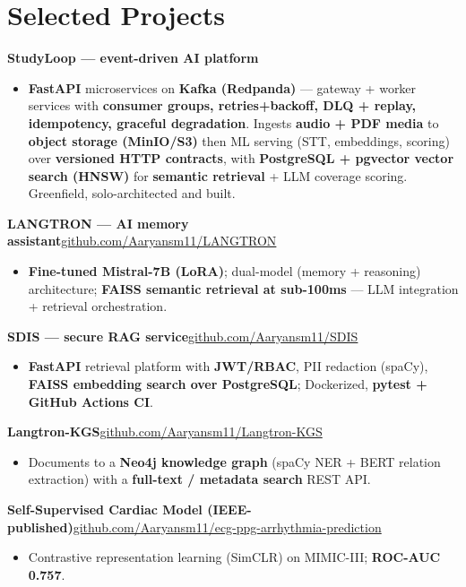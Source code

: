 \documentclass[10pt,a4paper]{article}
\begin{document}
\section*{Selected Projects}
\vspace{1pt}\textbf{StudyLoop --- event-driven AI platform}
\begin{itemize}
\item \textbf{FastAPI} microservices on \textbf{Kafka (Redpanda)} --- gateway + worker services with \textbf{consumer groups, retries+backoff, DLQ + replay, idempotency, graceful degradation}. Ingests \textbf{audio + PDF media} to \textbf{object storage (MinIO/S3)} then ML serving (STT, embeddings, scoring) over \textbf{versioned HTTP contracts}, with \textbf{PostgreSQL + pgvector vector search (HNSW)} for \textbf{semantic retrieval} + LLM coverage scoring. Greenfield, solo-architected and built.
\end{itemize}
\vspace{1pt}\textbf{LANGTRON --- AI memory assistant}\hfill {\small\href{https://github.com/Aaryansm11/LANGTRON}{github.com/Aaryansm11/LANGTRON}}
\begin{itemize}
\item \textbf{Fine-tuned Mistral-7B (LoRA)}; dual-model (memory + reasoning) architecture; \textbf{FAISS semantic retrieval at sub-100ms} --- LLM integration + retrieval orchestration.
\end{itemize}
\vspace{1pt}\textbf{SDIS --- secure RAG service}\hfill {\small\href{https://github.com/Aaryansm11/SDIS}{github.com/Aaryansm11/SDIS}}
\begin{itemize}
\item \textbf{FastAPI} retrieval platform with \textbf{JWT/RBAC}, PII redaction (spaCy), \textbf{FAISS embedding search over PostgreSQL}; Dockerized, \textbf{pytest + GitHub Actions CI}.
\end{itemize}
\vspace{1pt}\textbf{Langtron-KGS}\hfill {\small\href{https://github.com/Aaryansm11/Langtron-KGS}{github.com/Aaryansm11/Langtron-KGS}}
\begin{itemize}
\item Documents to a \textbf{Neo4j knowledge graph} (spaCy NER + BERT relation extraction) with a \textbf{full-text / metadata search} REST API.
\end{itemize}
\vspace{1pt}\textbf{Self-Supervised Cardiac Model (IEEE-published)}\hfill {\small\href{https://github.com/Aaryansm11/ecg-ppg-arrhythmia-prediction}{github.com/Aaryansm11/ecg-ppg-arrhythmia-prediction}}
\begin{itemize}
\item Contrastive representation learning (SimCLR) on MIMIC-III; \textbf{ROC-AUC 0.757}.
\end{itemize}
\end{document}
